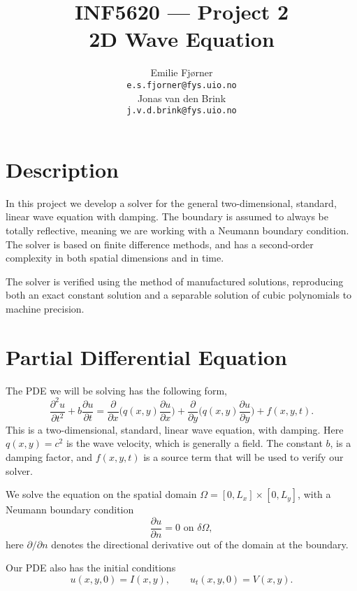\documentclass[a4paper, 11pt, notitlepage, english]{article}
\author{Emilie Fjørner \\[-0.4cm] \texttt{e.s.fjorner@fys.uio.no} \\[0.2cm] Jonas van den Brink \\[-0.4cm] \texttt{j.v.d.brink@fys.uio.no}}
\title{INF5620 --- Project 2 \\ 2D Wave Equation}
\newcommand{\p}{\partial}
\begin{document}
\maketitle

\vspace{1cm}

\section*{Description}

In this project we develop a solver for the general two-dimensional, standard, linear wave equation with damping. The boundary is assumed to always be totally reflective, meaning we are working with a Neumann boundary condition. The solver is based on finite difference methods, and has a second-order complexity in both spatial dimensions and in time.

The solver is verified using the method of manufactured solutions, reproducing both an exact constant solution and a separable solution of cubic polynomials to machine precision.



\clearpage

\section*{Partial Differential Equation}

The PDE we will be solving has the following form,
$$\frac{\p^2 u}{\p t^2} + b\frac{\p u}{\p t} = \frac{\p}{\p x}\bigg(q(x,y) \frac{\p u}{\p x}\bigg) + \frac{\p}{\p y}\bigg(q(x,y)\frac{\p u}{\p y} \bigg) + f(x,y,t).$$
This is a two-dimensional, standard, linear wave equation, with damping. Here $q(x,y) = c^2$ is the wave velocity, which is generally a field. The constant $b$, is a damping factor, and $f(x,y,t)$ is a source term that will be used to verify our solver.

We solve the equation on the spatial domain $\Omega = [0,L_x] \times [0,L_y]$, with a Neumann boundary condition
$$\frac{\p u}{\p n} = 0 \mbox{ on } \delta\Omega,$$
here $\p/\p n$ denotes the directional derivative out of the domain at the boundary.

Our PDE also has the initial conditions
$$u(x,y,0) = I(x,y), \qquad u_t(x,y,0) = V(x,y).$$
\end{document}

